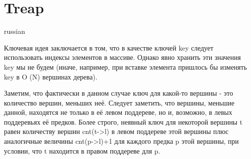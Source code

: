 \documentclass{article}
\begin{document}
\section{Treap}
\begin{otherlanguage*}{russian}

    Ключевая идея заключается в том, что в качестве ключей key следует использовать индексы элементов в массиве. Однако явно хранить эти значения key мы не будем (иначе, например, при вставке элемента пришлось бы изменять key в O (N) вершинах дерева).

    Заметим, что фактически в данном случае ключ для какой-то вершины - это количество вершин, меньших неё. Следует заметить, что вершины, меньшие данной, находятся не только в её левом поддереве, но и, возможно, в левых поддеревьях её предков. Более строго, неявный ключ для некоторой вершины t равен количеству вершин cnt(t->l) в левом поддереве этой вершины плюс аналогичные величины cnt(p->l)+1 для каждого предка p этой вершины, при условии, что t находится в правом поддереве для p.


\end{otherlanguage*}
\end{document}
